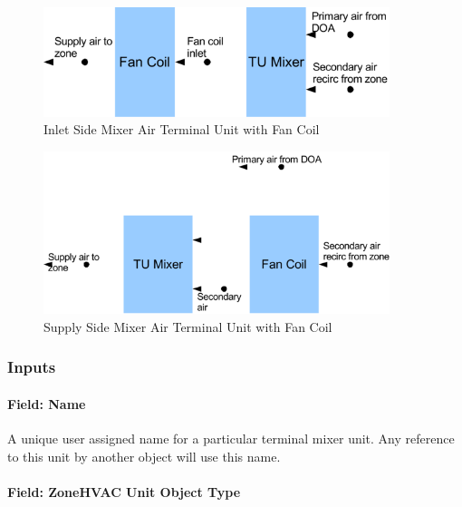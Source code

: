 \begin{figure}[hbtp] %
\centering
\includegraphics[width=0.9\textwidth, height=0.9\textheight, keepaspectratio=true]{media/image275.png}
\caption{Inlet Side Mixer Air Terminal Unit with Fan Coil \protect \label{fig:inlet-side-mixer-air-terminal-unit-with-fan}}
\end{figure}
\begin{figure}[hbtp] %
\centering
\includegraphics[width=0.9\textwidth, height=0.9\textheight, keepaspectratio=true]{media/image276.png}
\caption{Supply Side Mixer Air Terminal Unit with Fan Coil \protect \label{fig:supply-side-mixer-air-terminal-unit-with-fan}}
\end{figure}


\subsubsection{Inputs}\label{inputs-12-000}

\paragraph{Field: Name}\label{field-name-12}

A unique user assigned name for a particular terminal mixer unit. Any reference to this unit by another object will use this name.

\paragraph{Field: ZoneHVAC Unit Object Type}\label{field-zonehvac-unit-object-type}

